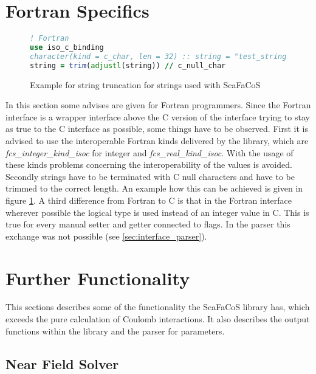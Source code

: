 \section{Fortran Specifics}

\begin{figure}[htb]
\begin{lstlisting}[language=Fortran,frame=trBL,breaklines,basicstyle=\small,prebreak={\raisebox{0ex}[0ex][0ex]{\ensuremath{\hookleftarrow}}}]
! Fortran
use iso_c_binding
character(kind = c_char, len = 32) :: string = "test_string"
string = trim(adjustl(string)) // c_null_char
\end{lstlisting}
\caption{Example for string truncation for strings used with ScaFaCoS}
\label{fig:example_string_fortran2c}
\end{figure}


In this section some advises are given for Fortran programmers. Since the Fortran interface is a wrapper interface above the C version of the interface trying to
stay as true to the C interface as possible, some things have to be observed. First it is advised to use the interoperable Fortran kinds delivered by the
library, which are \textit{fcs\_integer\_kind\_isoc} for integer and \textit{fcs\_real\_kind\_isoc}. With the usage of these kinds problems concerning the 
interoperability of the values is avoided. Secondly strings have to be terminated with C null characters and have to be trimmed to the correct length. An
example how this can be achieved is given in figure \ref{fig:example_string_fortran2c}. A third difference from Fortran to C is that in the Fortran interface
wherever possible the logical type is used instead of an integer value in C. This is true for every manual setter and getter connected to flags. In the parser
this exchange was not possible (see \ref{sec:interface_parser}).


\section{Further Functionality}

This sections describes some of the functionality the ScaFaCoS library has, which exceeds the pure calculation of Coulomb interactions. It also describes the
output functions within the library and the parser for parameters.

\label{sec:interface_functions}
\subsection{Near Field Solver}
\label{sec:near_field_solver}

